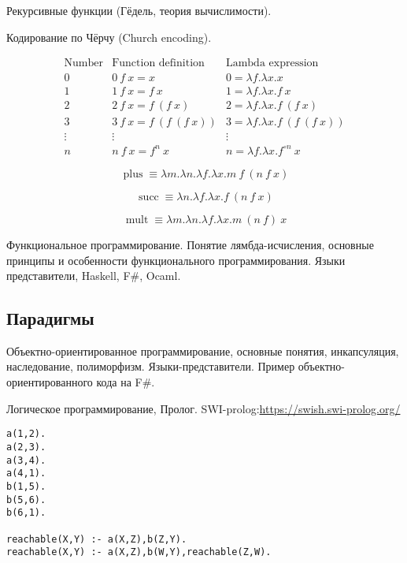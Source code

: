 Рекурсивные функции (Гёдель, теория вычислимости).

Кодирование по Чёрчу (Church encoding).

$$
\begin{array}{r|l|l}{\text{Number}}&{\text{Function definition}}&{\text{Lambda expression}}\\\hline 0&0\ f\ x=x&0=\lambda f.\lambda x.x\\1&1\ f\ x=f\ x&1=\lambda f.\lambda x.f\ x\\2&2\ f\ x=f\ (f\ x)&2=\lambda f.\lambda x.f\ (f\ x)\\3&3\ f\ x=f\ (f\ (f\ x))&3=\lambda f.\lambda x.f\ (f\ (f\ x))\\\vdots &\vdots &\vdots \\n&n\ f\ x=f^{n}\ x&n=\lambda f.\lambda x.f^{\circ n}\ x
\end{array}
$$


$$
\operatorname {plus} \equiv \lambda m.\lambda n.\lambda f.\lambda x.m\ f\ (n\ f\ x)
$$

$$
\operatorname {succ} \equiv \lambda n.\lambda f.\lambda x.f\ (n\ f\ x)
$$

$$
 \displaystyle \operatorname {mult} \equiv \lambda m.\lambda n.\lambda f.\lambda x.m\ (n\ f)\ x
$$

Функциональное программирование. Понятие лямбда-исчисления, основные принципы и особенности функционального программирования. Языки представители, Haskell, F\#, Ocaml.


    

\subsection{Парадигмы}
Объектно-ориентированное программирование, основные понятия, инкапсуляция, наследование, полиморфизм. Языки-представители. Пример объектно-ориентированного кода на F\#. 

    













    Логическое программирование, Пролог. 
    SWI-prolog:\url{https://swish.swi-prolog.org/}
    \begin{verbatim}
a(1,2).
a(2,3).
a(3,4).
a(4,1).
b(1,5).
b(5,6).
b(6,1).

reachable(X,Y) :- a(X,Z),b(Z,Y).
reachable(X,Y) :- a(X,Z),b(W,Y),reachable(Z,W).
    \end{verbatim}

